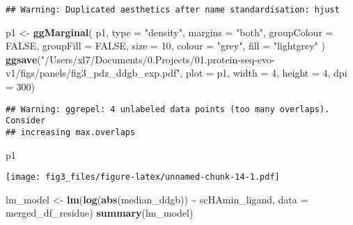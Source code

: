 \documentclass[
]{article}
\newenvironment{Shaded}{\begin{snugshade}}{\end{snugshade}}
\newcommand{\AttributeTok}[1]{\textcolor[rgb]{0.13,0.29,0.53}{#1}}
\newcommand{\ConstantTok}[1]{\textcolor[rgb]{0.56,0.35,0.01}{#1}}
\newcommand{\DecValTok}[1]{\textcolor[rgb]{0.00,0.00,0.81}{#1}}
\newcommand{\FunctionTok}[1]{\textcolor[rgb]{0.13,0.29,0.53}{\textbf{#1}}}
\newcommand{\NormalTok}[1]{#1}
\newcommand{\OtherTok}[1]{\textcolor[rgb]{0.56,0.35,0.01}{#1}}
\newcommand{\SpecialCharTok}[1]{\textcolor[rgb]{0.81,0.36,0.00}{\textbf{#1}}}
\newcommand{\StringTok}[1]{\textcolor[rgb]{0.31,0.60,0.02}{#1}}
\begin{document}
\begin{verbatim}
## Warning: Duplicated aesthetics after name standardisation: hjust
\end{verbatim}

\begin{Shaded}
\begin{Highlighting}[]
\NormalTok{p1 }\OtherTok{\textless{}{-}} \FunctionTok{ggMarginal}\NormalTok{(}
\NormalTok{  p1,}
  \AttributeTok{type =} \StringTok{"density"}\NormalTok{,}
  \AttributeTok{margins =} \StringTok{"both"}\NormalTok{,}
  \AttributeTok{groupColour =} \ConstantTok{FALSE}\NormalTok{,}
  \AttributeTok{groupFill =} \ConstantTok{FALSE}\NormalTok{,}
  \AttributeTok{size =} \DecValTok{10}\NormalTok{,}
  \AttributeTok{colour =} \StringTok{"grey"}\NormalTok{,}
  \AttributeTok{fill =} \StringTok{"lightgrey"}
\NormalTok{)}
\FunctionTok{ggsave}\NormalTok{(}\StringTok{"/Users/xl7/Documents/0.Projects/01.protein{-}seq{-}evo{-}v1/figs/panels/fig3\_pdz\_ddgb\_exp.pdf"}\NormalTok{, }
       \AttributeTok{plot =}\NormalTok{ p1, }\AttributeTok{width =} \DecValTok{4}\NormalTok{, }\AttributeTok{height =} \DecValTok{4}\NormalTok{, }\AttributeTok{dpi =} \DecValTok{300}\NormalTok{)}
\end{Highlighting}
\end{Shaded}

\begin{verbatim}
## Warning: ggrepel: 4 unlabeled data points (too many overlaps). Consider
## increasing max.overlaps
\end{verbatim}

\begin{Shaded}
\begin{Highlighting}[]
\NormalTok{p1}
\end{Highlighting}
\end{Shaded}

\texttt{[image: fig3\_files/figure-latex/unnamed-chunk-14-1.pdf]}

\begin{Shaded}
\begin{Highlighting}[]
\NormalTok{lm\_model }\OtherTok{\textless{}{-}} \FunctionTok{lm}\NormalTok{(}\FunctionTok{log}\NormalTok{(}\FunctionTok{abs}\NormalTok{(median\_ddgb)) }\SpecialCharTok{\textasciitilde{}}\NormalTok{ scHAmin\_ligand, }\AttributeTok{data =}\NormalTok{ merged\_df\_residue)}
\FunctionTok{summary}\NormalTok{(lm\_model)}
\end{Highlighting}
\end{Shaded}
\end{document}
